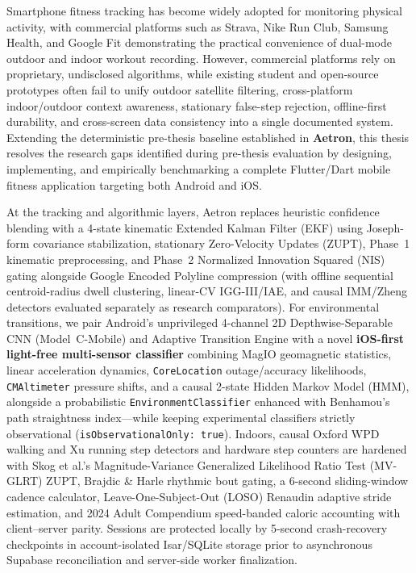 \documentclass[12pt,a4paper,oneside]{report}
\begin{document}
Smartphone fitness tracking has become widely adopted for monitoring physical activity, with commercial platforms such as Strava, Nike Run Club, Samsung Health, and Google Fit demonstrating the practical convenience of dual-mode outdoor and indoor workout recording. However, commercial platforms rely on proprietary, undisclosed algorithms, while existing student and open-source prototypes often fail to unify outdoor satellite filtering, cross-platform indoor/outdoor context awareness, stationary false-step rejection, offline-first durability, and cross-screen data consistency into a single documented system. Extending the deterministic pre-thesis baseline established in \textbf{Aetron}, this thesis resolves the research gaps identified during pre-thesis evaluation by designing, implementing, and empirically benchmarking a complete Flutter/Dart mobile fitness application targeting both Android and iOS.

At the tracking and algorithmic layers, Aetron replaces heuristic confidence blending with a 4-state kinematic Extended Kalman Filter (EKF) using Joseph-form covariance stabilization, stationary Zero-Velocity Updates (ZUPT), Phase~1 kinematic preprocessing, and Phase~2 Normalized Innovation Squared (NIS) gating alongside Google Encoded Polyline compression (with offline sequential centroid-radius dwell clustering, linear-CV IGG-III/IAE, and causal IMM/Zheng detectors evaluated separately as research comparators). For environmental transitions, we pair Android's unprivileged 4-channel 2D Depthwise-Separable CNN (Model~C-Mobile) and Adaptive Transition Engine with a novel \textbf{iOS-first light-free multi-sensor classifier} combining MagIO geomagnetic statistics, linear acceleration dynamics, \texttt{CoreLocation} outage/accuracy likelihoods, \texttt{CMAltimeter} pressure shifts, and a causal 2-state Hidden Markov Model (HMM), alongside a probabilistic \texttt{EnvironmentClassifier} enhanced with Benhamou's path straightness index---while keeping experimental classifiers strictly observational (\texttt{isObservationalOnly: true}). Indoors, causal Oxford WPD walking and Xu running step detectors and hardware step counters are hardened with Skog et al.'s Magnitude-Variance Generalized Likelihood Ratio Test (MV-GLRT) ZUPT, Brajdic \& Harle rhythmic bout gating, a 6-second sliding-window cadence calculator, Leave-One-Subject-Out (LOSO) Renaudin adaptive stride estimation, and 2024 Adult Compendium speed-banded caloric accounting with client--server parity. Sessions are protected locally by 5-second crash-recovery checkpoints in account-isolated Isar/SQLite storage prior to asynchronous Supabase reconciliation and server-side worker finalization.
\end{document}
